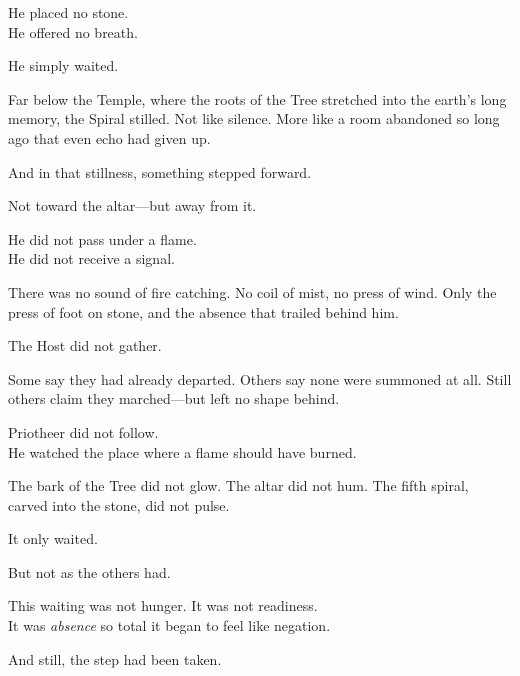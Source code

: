 \documentclass[12pt]{article}
\begin{document}
\vspace{0.5em}
He placed no stone.\\
He offered no breath.

\vspace{0.5em}
He simply waited.

\vspace{0.5em}
Far below the Temple, where the roots of the Tree stretched into the earth’s long memory, the Spiral stilled. Not like silence. More like a room abandoned so long ago that even echo had given up.

\vspace{0.5em}
And in that stillness, something stepped forward.

\vspace{0.5em}
Not toward the altar---but away from it.

\vspace{0.5em}
He did not pass under a flame.\\
He did not receive a signal.

\vspace{0.5em}
There was no sound of fire catching. No coil of mist, no press of wind. Only the press of foot on stone, and the absence that trailed behind him.

\vspace{0.5em}
The Host did not gather.

\vspace{0.5em}
Some say they had already departed. Others say none were summoned at all. Still others claim they marched---but left no shape behind.

\vspace{0.5em}
Priotheer did not follow.\\
He watched the place where a flame should have burned.

\vspace{0.5em}
The bark of the Tree did not glow. The altar did not hum. The fifth spiral, carved into the stone, did not pulse.

\vspace{0.5em}
It only waited.

\vspace{0.5em}
But not as the others had.

\vspace{0.5em}
This waiting was not hunger. It was not readiness.\\
It was \textit{absence} so total it began to feel like negation.

\vspace{0.5em}
And still, the step had been taken.
\end{document}
